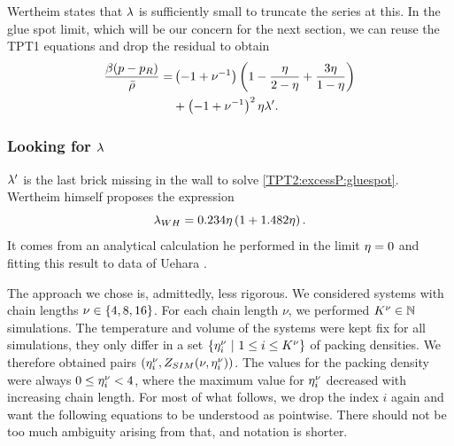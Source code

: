 \documentclass[8.5pt,twoside,twocolumn]{article}
\theoremstyle{standard}
\begin{document}
Wertheim states that $\lambda$ is sufficiently small to truncate the series at this.
In the glue spot limit, which will be our concern for the next section, we
can reuse the TPT1 equations and drop the residual to obtain
\begin{equation}
\begin{aligned}
\frac{\beta(p-p_R)}{\bar\rho}=&\left({-1+\nu^{-1}}\right)\left({1-\frac\eta{2-\eta}+\frac{3\eta}{1-\eta}}\right)\\
&+\left({-1+\nu^{-1}}\right)^2\eta\lambda'.
\end{aligned}
\label{TPT2:excessP:gluespot}
\end{equation}

\subsubsection{Looking for $\lambda$}
$\lambda'$ is the last brick missing in the wall to solve \eqref{TPT2:excessP:gluespot}. Wertheim himself
proposes the expression
\renewcommand\infty{{all}}
\newcommand\lawh{\la_{WH}}
\newcommand\lao{\la_{opt}}
\newcommand\lanu{\la'_{\tilde \nu}}
\newcommand\laf{\la'_{4}}
\newcommand\lae{\la'_{8}}
\newcommand\las{\la'_{16}}
\newcommand\lai{\la'_{\infty}}
\newcommand\zsim{Z_{SIM}}
\newcommand\zr{Z_{R}}
\newcommand\enui{\e^\nu_i}
\begin{equation}
\lawh=0.234 \e\rb{1+1.482\e}.
\label{TPT:la:laWH}
\end{equation}
It comes from an analytical calculation he performed in the limit $\eta=0$ and
fitting this result to data of Uehara \etal\cite{Uehara1979}.

The approach we chose is, admittedly, less rigorous. We considered systems with chain
lengths \mbox{$\nu\in\left\{{4,8,16} \right\}$}.
For each chain length $\nu$, we performed $K^\nu\in\mathbb{N}$ simulations\cite{Westen2013}.
The temperature and volume of the systems were kept fix for all simulations, they only differ in a set
\mbox{$\st{\enui\ |\ 1 \le i \le K^\nu}$} of packing densities. We therefore obtained
pairs \mbox{$(\enui,\zsim(\nu,\e^\nu_i))$}. The values for the packing density were always 
$0\le\enui< 4$, where the maximum value for $\enui$ decreased with increasing chain length.
For most of what follows, we drop the index $i$ again and want the following equations to be
understood as pointwise. There should not be too much ambiguity arising from that, and notation
is shorter.
\end{document}
